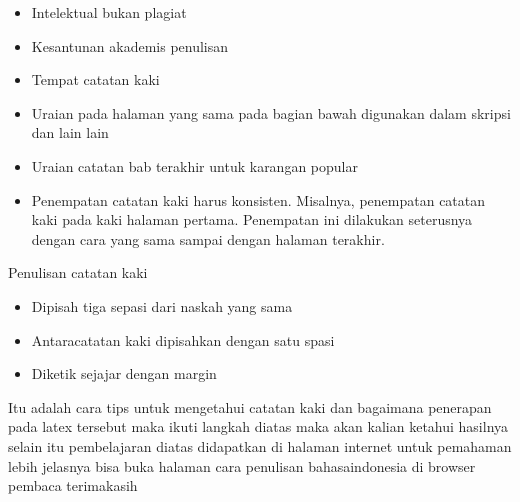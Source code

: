 \begin{itemize}
\vspace{\baselineskip}
	\item Intelektual bukan plagiat\par

\vspace{\baselineskip}
	\item Kesantunan akademis penulisan\par

\vspace{\baselineskip}
	\item Tempat catatan kaki\par

\vspace{\baselineskip}
	\item Uraian pada halaman yang sama pada bagian bawah digunakan dalam skripsi dan lain lain\par

\vspace{\baselineskip}
	\item Uraian catatan bab terakhir untuk karangan popular\par

\vspace{\baselineskip}
	\item Penempatan catatan kaki harus konsisten. Misalnya, penempatan catatan kaki pada kaki halaman pertama. Penempatan ini dilakukan seterusnya dengan cara yang sama sampai dengan halaman terakhir.
\end{itemize}\par

\vspace{\baselineskip}
  Penulisan catatan kaki\par

\begin{itemize}
	\vspace{\baselineskip}
	\item Dipisah tiga sepasi dari naskah yang sama\par

\vspace{\baselineskip}
	\item Antaracatatan kaki dipisahkan dengan satu spasi\par

\vspace{\baselineskip}
	\item Diketik sejajar dengan margin
\end{itemize}\par

\vspace{\baselineskip}
\noindent Itu adalah cara tips untuk mengetahui catatan kaki dan bagaimana penerapan pada latex tersebut maka ikuti langkah diatas maka akan kalian ketahui hasilnya selain itu pembelajaran diatas didapatkan di halaman internet untuk pemahaman lebih jelasnya bisa buka halaman cara penulisan bahasaindonesia di browser pembaca terimakasih\par
